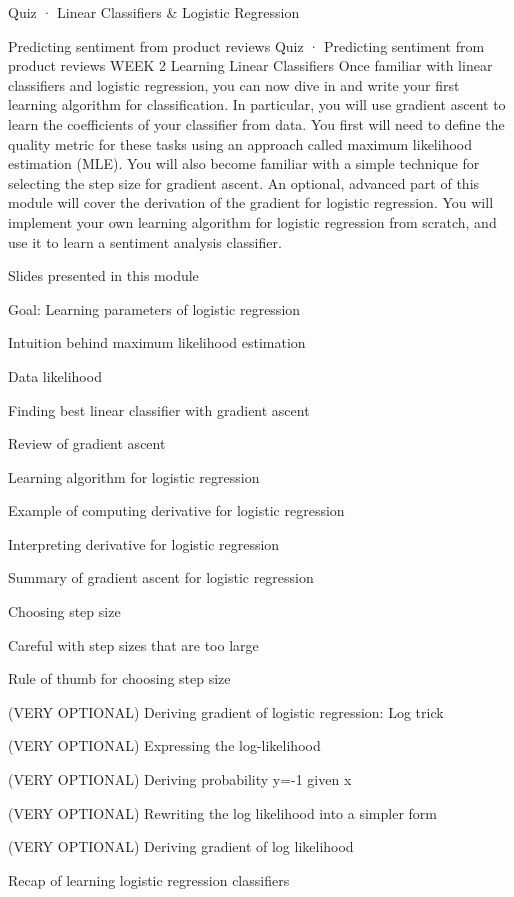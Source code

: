 Quiz · Linear Classifiers & Logistic Regression
\item Predicting sentiment from product reviews
Quiz · Predicting sentiment from product reviews
WEEK 2
Learning Linear Classifiers
Once familiar with linear classifiers and logistic regression, you can now dive in and write your first learning algorithm for classification. In particular, you will use gradient ascent to learn the coefficients of your classifier from data. You first will need to define the quality metric for these tasks using an approach called maximum likelihood estimation (MLE). You will also become familiar with a simple technique for selecting the step size for gradient ascent. An optional, advanced part of this module will cover the derivation of the gradient for logistic regression. You will implement your own learning algorithm for logistic regression from scratch, and use it to learn a sentiment analysis classifier.
\item Slides presented in this module
\item Goal: Learning parameters of logistic regression
\item Intuition behind maximum likelihood estimation
\item Data likelihood
\item Finding best linear classifier with gradient ascent
\item Review of gradient ascent
\item Learning algorithm for logistic regression
\item Example of computing derivative for logistic regression
\item Interpreting derivative for logistic regression
\item Summary of gradient ascent for logistic regression
\item Choosing step size
\item Careful with step sizes that are too large
\item Rule of thumb for choosing step size
\item (VERY OPTIONAL) Deriving gradient of logistic regression: Log trick
\item (VERY OPTIONAL) Expressing the log-likelihood
\item (VERY OPTIONAL) Deriving probability y=-1 given x
\item (VERY OPTIONAL) Rewriting the log likelihood into a simpler form
\item (VERY OPTIONAL) Deriving gradient of log likelihood
\item Recap of learning logistic regression classifiers
